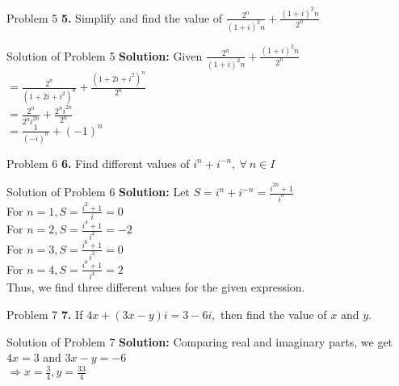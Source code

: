 \documentclass[aspectratio=169,8pt]{beamer}
\begin{document}
\begin{frame}{Problem 5}
  \textbf{5.} Simplify and find the value of $\frac{2^n}{(1 + i)^2n} + \frac{(1 + i)^2n}{2^n}$
\end{frame}
\begin{frame}{Solution of Problem 5}
  \textbf{Solution:} Given $\frac{2^n}{(1 + i)^2n} + \frac{(1 + i)^2n}{2^n}$\\
  \vspace*{0.2cm}
  $= \frac{2^n}{(1 + 2i + i^2)^n} + \frac{(1 + 2i + i^2)^n}{2^n}$\\
  \vspace*{0.2cm}
  $= \frac{2^n}{2^ni^{2n}} + \frac{2^ni^{2n}}{2^n}$\\
  \vspace*{0.2cm}
  $= \frac{1}{(-i)^n} + (-1)^n$
\end{frame}
\begin{frame}{Problem 6}
  \textbf{6.} Find different values of $i^n + i^{-n},~\forall~n\in I$
\end{frame}
\begin{frame}{Solution of Problem 6}
  \textbf{Solution:} Let $S = i^n + i^{-n} = \frac{i^{2n} + 1}{i^n}$\\
  \vspace*{0.2cm}
  For $n = 1, S = \frac{i^2 + 1}{i} = 0$\\
  \vspace*{0.2cm}
  For $n = 2, S = \frac{i^4 + 1}{i^2} = -2$\\
  \vspace*{0.2cm}
  For $n = 3, S = \frac{i^6 + 1}{i^3} = 0$\\
  \vspace*{0.2cm}
  For $n = 4, S = \frac{i^8 + 1}{i^4} = 2$\\
  \vspace*{0.2cm}
  Thus, we find three different values for the given expression.
\end{frame}
\begin{frame}{Problem 7}
  \textbf{7.} If $4x + (3x - y)i = 3 -6i,$ then find the value of $x$ and $y.$
\end{frame}
\begin{frame}{Solution of Problem 7}
  \textbf{Solution:} Comparing real and imaginary parts, we get\\
  \vspace*{0.2cm}
  $4x = 3$ and $3x - y = -6$\\
  \vspace*{0.2cm}
  $\Rightarrow x = \frac{3}{4}, y = \frac{33}{4}$
\end{frame}
\end{document}

